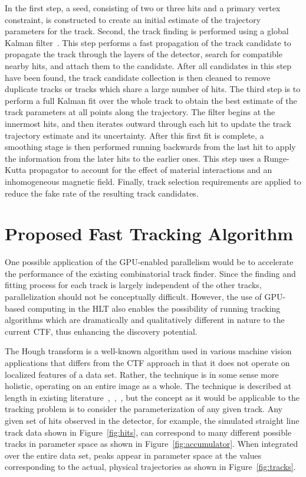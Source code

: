 \documentclass{JINST}
\begin{document}
In the first step, a seed, consisting of two or three hits and a primary vertex constraint,
is constructed to create an initial estimate of the trajectory parameters for the track. Second, the
track finding is performed using a global Kalman filter~\cite{Fruhwirth:1987fm}. This step performs a fast
propagation of the track candidate to propagate the track through the layers of the detector, search for
compatible nearby hits, and attach them to the candidate. After all candidates in this step have been
found, the track candidate collection is then cleaned to remove duplicate tracks or tracks which share a
large number of hits.  The third step is to perform a full Kalman fit over the whole track to obtain the
best estimate of the track parameters at all points along the trajectory. The filter begins at the
innermost hits, and then iterates outward through each hit to update the track trajectory estimate and
its uncertainty. After this first fit is complete, a smoothing stage is then performed running backwards
from the last hit to apply the information from the later hits to the earlier ones. This step uses a
Runge-Kutta propagator to account for the effect of material interactions and an inhomogeneous magnetic
field. Finally, track selection requirements are applied to reduce the fake rate of the resulting track
candidates.



\section{Proposed Fast Tracking Algorithm}

One possible application of the GPU-enabled parallelism would be to accelerate the performance of the
existing combinatorial track finder.  Since the finding and fitting process for each track is largely
independent of the other tracks, parallelization should not be conceptually difficult.  However, the use
of GPU-based computing in the HLT also enables the possibility of running tracking algorithms which are
dramatically and qualitatively different in nature to the current CTF, thus enhancing the discovery potential.

 The Hough transform is a well-known algorithm used in various machine
vision applications that differs from the CTF approach in that it does not operate on
localized features of a data set.  Rather, the technique is in some sense more
holistic, operating on an entire image as a whole. 
The technique is described at length in existing literature~\cite{bib:HT1},~\cite{bib:HT2},~\cite{bib:HT3},
but the concept as it would be applicable to the
tracking problem is to consider the parameterization of any given track.  Any given set of hits
observed in the detector, for example, the simulated straight line track data shown in Figure~\ref{fig:hits},
can correspond to many different possible tracks in parameter space as shown in Figure~\ref{fig:accumulator}.
When integrated over the entire data set, peaks appear in parameter space at the values corresponding to the actual, 
physical trajectories as shown in Figure~\ref{fig:tracks}. 
\end{document}
